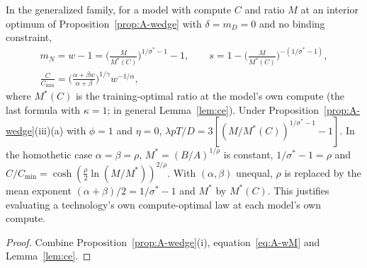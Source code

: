 \begin{corollary}\label{cor:suff}
In the generalized family, for a model with compute $C$ and ratio $M$ at an interior optimum of
Proposition~\ref{prop:A-wedge} with $\delta=m_D=0$ and no binding constraint,
\begin{gather*}
m_N=w-1=\Big(\frac{M}{M^*(C)}\Big)^{1/\sigma^*-1}-1,\qquad s=1-\Big(\frac{M}{M^*(C)}\Big)^{-(1/\sigma^*-1)},\\
\frac{C}{C_{\min}}=\Big(\frac{\alpha+\beta w}{\alpha+\beta}\Big)^{1/\gamma}w^{-1/\alpha},
\end{gather*}
where $M^*(C)$ is the training-optimal ratio at the model's own compute (the last formula with $\kappa=1$; in general
Lemma~\ref{lem:ce}). Under Proposition~\ref{prop:A-wedge}(iii)(a) with $\phi=1$ and $\eta=0$,
$\lambda pT/D=3[(M/M^*(C))^{1/\sigma^*-1}-1]$. In the homothetic case $\alpha=\beta=\rho$, $M^*=(B/A)^{1/\rho}$ is constant,
$1/\sigma^*-1=\rho$ and $C/C_{\min}=\cosh(\tfrac\rho2\ln(M/M^*))^{2/\rho}$. With $(\alpha,\beta)$ unequal, $\rho$ is
replaced by the mean exponent $(\alpha+\beta)/2=1/\sigma^*-1$ and $M^*$ by $M^*(C)$. This justifies evaluating a
technology's own compute-optimal law at each model's own compute.
\end{corollary}

\begin{proof}
Combine Proposition~\ref{prop:A-wedge}(i), equation~\eqref{eq:A-wM} and Lemma~\ref{lem:ce}.
\end{proof}

